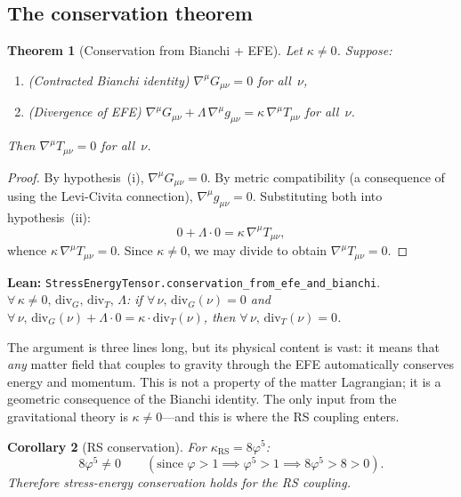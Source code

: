 \documentclass[11pt,a4paper]{article}
\newtheorem{theorem}{Theorem}[section]
\newtheorem{corollary}[theorem]{Corollary}
\newcommand{\vp}{\varphi}
\newcommand{\kRS}{\kappa_{\mathrm{RS}}}
\newcommand{\lean}[1]{\texttt{#1}}
\newcommand{\leanref}[2]{\noindent\textbf{Lean:} \lean{#1}.\ \ \textit{#2}}
\begin{document}
\subsection{The conservation theorem}

\begin{theorem}[Conservation from Bianchi + EFE]
\label{thm:conservation}
Let $\kappa \ne 0$.  Suppose:
\begin{enumerate}[label=(\roman*)]
\item (Contracted Bianchi identity) $\nabla^\mu G_{\mu\nu} = 0$ for all~$\nu$,
\item (Divergence of EFE) $\nabla^\mu G_{\mu\nu} + \Lambda\,\nabla^\mu g_{\mu\nu} = \kappa\,\nabla^\mu T_{\mu\nu}$ for all~$\nu$.
\end{enumerate}
Then $\nabla^\mu T_{\mu\nu} = 0$ for all~$\nu$.
\end{theorem}

\begin{proof}
By hypothesis~(i), $\nabla^\mu G_{\mu\nu} = 0$.
By metric compatibility (a consequence of using the Levi-Civita connection), $\nabla^\mu g_{\mu\nu} = 0$.
Substituting both into hypothesis~(ii):
\[
0 + \Lambda \cdot 0 = \kappa\,\nabla^\mu T_{\mu\nu},
\]
whence $\kappa\,\nabla^\mu T_{\mu\nu} = 0$.
Since $\kappa \ne 0$, we may divide to obtain $\nabla^\mu T_{\mu\nu} = 0$.
\end{proof}

\leanref{StressEnergyTensor.conservation\_from\_efe\_and\_bianchi}{$\forall\,\kappa \ne 0,\,\mathrm{div}_G,\,\mathrm{div}_T,\,\Lambda$: if $\forall\,\nu,\,\mathrm{div}_G(\nu) = 0$ and $\forall\,\nu,\,\mathrm{div}_G(\nu) + \Lambda \cdot 0 = \kappa \cdot \mathrm{div}_T(\nu)$, then $\forall\,\nu,\,\mathrm{div}_T(\nu) = 0$.}

\noindent The argument is three lines long, but its physical content is vast: it means that \emph{any} matter field that couples to gravity through the EFE automatically conserves energy and momentum.
This is not a property of the matter Lagrangian; it is a geometric consequence of the Bianchi identity.
The only input from the gravitational theory is $\kappa \ne 0$---and this is where the RS coupling enters.

\begin{corollary}[RS conservation]
\label{cor:rs_conservation}
For $\kRS = 8\vp^5$:
\begin{equation}\label{eq:rs_nonzero}
8\vp^5 \ne 0 \qquad (\text{since } \vp > 1 \implies \vp^5 > 1 \implies 8\vp^5 > 8 > 0).
\end{equation}
Therefore stress-energy conservation holds for the RS coupling.
\end{corollary}
\end{document}

